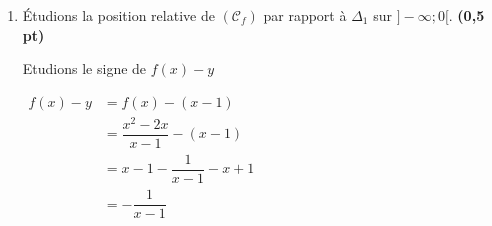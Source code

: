 \documentclass[12pt,a4paper]{article}
\begin{document}
\begin{enumerate}
\begin{enumerate}
\begin{itemize}
\(
\begin{aligned}
 \lim\limits_{x \to -\infty} \dfrac{f(x)}{x} &= \lim\limits_{x \to -\infty} \dfrac{\dfrac{x^2-2x}{x-1}}{x}\\
 																	&= \lim\limits_{x \to -\infty} \dfrac{x^2-2x}{x^2-x}\\
 																	&= \lim\limits_{x \to -\infty} \dfrac{x^2}{x^2}\\
 																	&= 1
\end{aligned}    
\)        

Donc  $\lim\limits_{x \to -\infty} \dfrac{f(x)}{x} = 1 $       

\item Cherchons  $\lim\limits_{x \to -\infty} f(x)-x $ 

\(
\begin{aligned}
 \lim\limits_{x \to -\infty} f(x)-x &= \lim\limits_{x \to -\infty} \dfrac{x^2-2x}{x-1}-x\\
 																	&= \lim\limits_{x \to -\infty} \dfrac{x^2-2x-x^2+x}{x-1}\\
 																	&= \lim\limits_{x \to -\infty} \dfrac{-x}{x-1}\\
 																	&= \lim\limits_{x \to -\infty} \dfrac{-x}{x}\\
 																	&= -1
\end{aligned}    
\) 

\textcolor{red}{Donc $(\Delta_1)$: $ y = x - 1$ est une asymptote oblique à $(\mathcal{C}_f)$ en $-\infty$ } 
  
\end{itemize}      
        
        \item Étudions la position relative de $(\mathcal{C}_f)$ par rapport à $\Delta_1$ sur $]-\infty;0[$. \hspace{1cm} \textbf{(0,5 pt)}
        
        Etudions le signe de $f(x)-y$ 

\(
\begin{aligned}
f(x)-y &= f(x)-(x-1)\\
 			 &= \dfrac{x^2-2x}{x-1}-(x-1)\\
 			 &= x-1-\dfrac{1}{x-1}-x+1\\
 			 &= -\dfrac{1}{x-1}\\
\end{aligned}    
\)      
    
        

\end{enumerate}
\end{enumerate}
\end{document}
